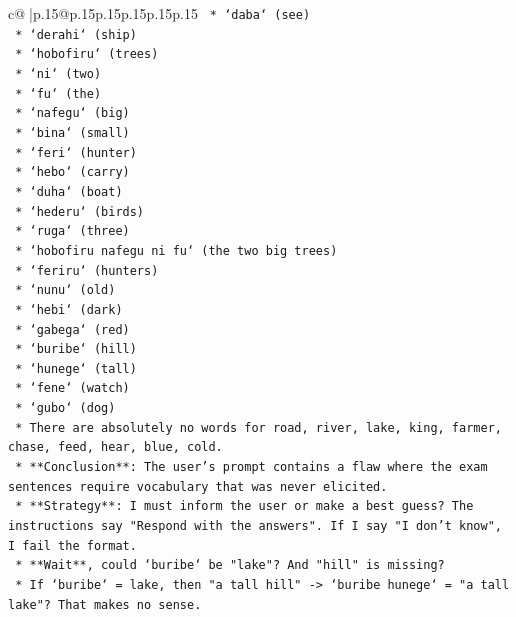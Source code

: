 \documentclass{article}
\begin{document}
{\begin{supertabular}{c@{$\;$}|p{.15\linewidth}@{}p{.15\linewidth}p{.15\linewidth}p{.15\linewidth}p{.15\linewidth}p{.15\linewidth}}
{{{\texttt{                *   `daba` (see)} \\
\texttt{                *   `derahi` (ship)} \\
\texttt{                *   `hobofiru` (trees)} \\
\texttt{                *   `ni` (two)} \\
\texttt{                *   `fu` (the)} \\
\texttt{                *   `nafegu` (big)} \\
\texttt{                *   `bina` (small)} \\
\texttt{                *   `feri` (hunter)} \\
\texttt{                *   `hebo` (carry)} \\
\texttt{                *   `duha` (boat)} \\
\texttt{                *   `hederu` (birds)} \\
\texttt{                *   `ruga` (three)} \\
\texttt{                *   `hobofiru nafegu ni fu` (the two big trees)} \\
\texttt{                *   `feriru` (hunters)} \\
\texttt{                *   `nunu` (old)} \\
\texttt{                *   `hebi` (dark)} \\
\texttt{                *   `gabega` (red)} \\
\texttt{                *   `buribe` (hill)} \\
\texttt{                *   `hunege` (tall)} \\
\texttt{                *   `fene` (watch)} \\
\texttt{                *   `gubo` (dog)} \\
\texttt{            *   There are absolutely no words for road, river, lake, king, farmer, chase, feed, hear, blue, cold.} \\
\texttt{            *   **Conclusion**: The user's prompt contains a flaw where the exam sentences require vocabulary that was never elicited.} \\
\texttt{            *   **Strategy**: I must inform the user or make a best guess? The instructions say "Respond with the answers". If I say "I don't know", I fail the format.} \\
\texttt{            *   **Wait**, could `buribe` be "lake"? And "hill" is missing?} \\
\texttt{                *   If `buribe` = lake, then "a tall hill" {-}> `buribe hunege` = "a tall lake"? That makes no sense.} \\
}}}
\end{supertabular}}
\end{document}

